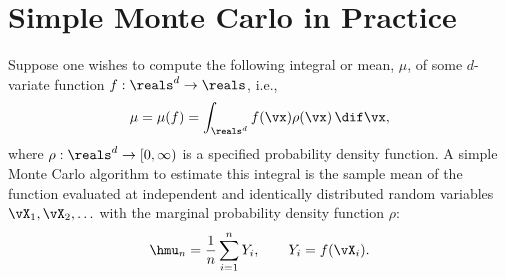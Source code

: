 \documentclass[12pt]{amsart}
\begin{document}
\section{Simple Monte Carlo in Practice}

Suppose one wishes to compute the following integral or mean, $\mu$, of some $d$-variate function $f: \reals^d \to \reals$, i.e.,
\begin{equation*}
\mu= \mu(f) = \int_{\reals^d} f(\vx) \rho(\vx) \, \dif \vx,
\end{equation*}
where $\rho: \reals^d \to [0,\infty)$ is a specified probability density function.  A simple Monte Carlo algorithm to estimate this integral is the sample mean of the function evaluated at independent and identically distributed random variables $\vX_1, \vX_2, \ldots$ with the marginal probability density function $\rho$:
\begin{equation*} %
\hmu_n = \frac 1n \sum_{i=1}^n Y_i, \qquad Y_i = f(\vX_i).
\end{equation*}
\end{document}
